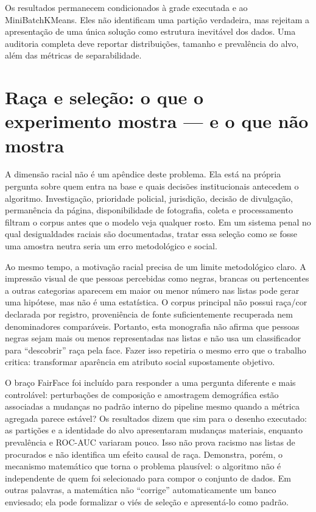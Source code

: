 Os resultados permanecem condicionados à grade executada e ao MiniBatchKMeans. Eles não identificam uma partição verdadeira, mas rejeitam a apresentação de uma única solução como estrutura inevitável dos dados. Uma auditoria completa deve reportar distribuições, tamanho e prevalência do alvo, além das métricas de separabilidade.

\section{Raça e seleção: o que o experimento mostra --- e o que não mostra}

A dimensão racial não é um apêndice deste problema. Ela está na própria pergunta sobre quem entra na base e quais decisões institucionais antecedem o algoritmo. Investigação, prioridade policial, jurisdição, decisão de divulgação, permanência da página, disponibilidade de fotografia, coleta e processamento filtram o corpus antes que o modelo veja qualquer rosto. Em um sistema penal no qual desigualdades raciais são documentadas, tratar essa seleção como se fosse uma amostra neutra seria um erro metodológico e social.

Ao mesmo tempo, a motivação racial precisa de um limite metodológico claro. A impressão visual de que pessoas percebidas como negras, brancas ou pertencentes a outras categorias aparecem em maior ou menor número nas listas pode gerar uma hipótese, mas não é uma estatística. O corpus principal não possui raça/cor declarada por registro, proveniência de fonte suficientemente recuperada nem denominadores comparáveis. Portanto, esta monografia não afirma que pessoas negras sejam mais ou menos representadas nas listas e não usa um classificador para ``descobrir'' raça pela face. Fazer isso repetiria o mesmo erro que o trabalho critica: transformar aparência em atributo social supostamente objetivo.

O braço FairFace foi incluído para responder a uma pergunta diferente e mais controlável: perturbações de composição e amostragem demográfica estão associadas a mudanças no padrão interno do pipeline mesmo quando a métrica agregada parece estável? Os resultados dizem que sim para o desenho executado: as partições e a identidade do alvo apresentaram mudanças materiais, enquanto prevalência e ROC-AUC variaram pouco. Isso não prova racismo nas listas de procurados e não identifica um efeito causal de raça. Demonstra, porém, o mecanismo matemático que torna o problema plausível: o algoritmo não é independente de quem foi selecionado para compor o conjunto de dados. Em outras palavras, a matemática não ``corrige'' automaticamente um banco enviesado; ela pode formalizar o viés de seleção e apresentá-lo como padrão.


